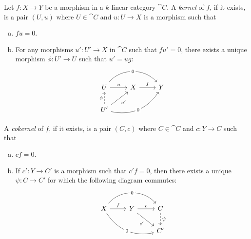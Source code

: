 \begin{definition}
    \label{def:k-linear-cat-kernel}
    Let \(f: X \to Y\) be a morphism in a \(k\)-linear category \(\cat C\). A
    \emph{kernel} of \(f\), if it exists, is a pair \((U, u)\) where
    \(U \in \cat C\) and \(u: U \to X\) is a morphism such that
    \begin{enumerate}[(a)]\setlength\itemsep{0em}
        \item \(f u = 0\).
        \item For any morphisms \(u': U' \to X\) in \(\cat C\) such that \(f u' = 0\),
              there exists a unique morphism \(\phi: U' \to U\) such that \(u' = u g\):
              \[
                  \begin{tikzcd}
                      U \ar[r, "u"] \ar[rr, bend left=50, "0" description]
                      &X \ar[r, "f"]
                      &Y
                      \\
                      U' \ar[u, "\phi", dashed] \ar[ru, "u'"'] \ar[rru, bend right=35, "0" description]
                      & &
                  \end{tikzcd}
              \]
    \end{enumerate}

    A \emph{cokernel} of \(f\), if it exists, is a pair \((C, c)\) where
    \(C \in \cat C\) and \(c: Y \to C\) such that
    \begin{enumerate}[(a)]\setlength\itemsep{0em}
        \item \(c f = 0\).

        \item If \(c': Y \to C'\) is a morphism such that \(c' f = 0\), then there exists
              a unique \(\psi: C \to C'\) for which the following diagram commutes:
              \[
                  \begin{tikzcd}
                      X
                      \ar[r, "f"]
                      \ar[rrd, bend right=35, "0" description]
                      \ar[rr, bend left=50, "0" description]
                      &Y
                      \ar[r, "c"]
                      \ar[dr, "c'"']
                      &C \ar[d, "\psi", dashed]
                      \\
                      &
                      &C'
                  \end{tikzcd}
              \]
    \end{enumerate}
\end{definition}

